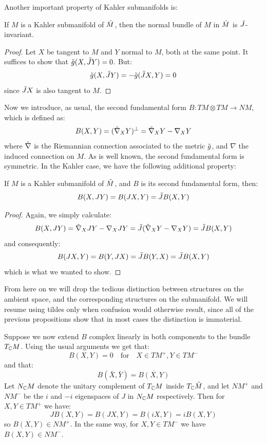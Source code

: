 Another important property of Kahler submanifolds is:

\begin{prop} If $M$ is a Kahler submanifold of $\tilde{M}$, then the normal bundle of $M$ in $\tilde{M}$ is $\tilde{J}$-invariant.
\end{prop}

\begin{proof} 
%
Let $X$ be tangent to $M$ and $Y$ normal to $M$, both at the same point.  It suffices to show that $\tilde{g} (X, \tilde{J} Y) = 0$.  But:
%
$$ \tilde{g} (X, \tilde{J} Y) = - \tilde{g} ( \tilde{J} X, Y) = 0 $$
%
since $ \tilde{J} X$ is also tangent to $M$.
%
\end{proof}

Now we introduce, as usual, the second fundamental form $B: TM \otimes TM \rightarrow NM$, which is defined as:
%
$$ B(X,Y) = (\tilde{\nabla}_X Y)^{\perp} = \tilde{\nabla}_X Y - \nabla_X Y $$
%
where $\tilde{\nabla}$ is the Riemannian connection associated to the metric $\tilde{g}$, and $\nabla$ the induced connection on $M$.  As is well known, the second fundamental form is symmetric.  In the Kahler case, we have the following additional property:
%
\begin{prop}
%
If $M$ is a Kahler submanifold of $\tilde{M}$, and $B$ is its second fundamental form, then:
%
$$ B(X,JY) = B(JX,Y) = \tilde{J} B(X,Y) $$
%
\end{prop}

\begin{proof}
%
Again, we simply calculate:
%
$$ B(X, JY) = \tilde{\nabla}_X J Y - \nabla_X JY = \tilde{J} ( \tilde{\nabla}_X Y - \nabla_X Y ) = \tilde{J} B(X,Y) $$
% 
and consequently:
%
$$ B( JX, Y ) = B( Y, JX ) = \tilde{J} B (Y,X) = \tilde{J} B(X,Y) $$
%
which is what we wanted to show.
%
\end{proof}

From here on we will drop the tedious distinction between structures on the ambient space, and the corresponding structures on the submanifold. We will resume using tildes only when confusion would otherwise result, since all of the previous propositions show that in most cases the distinction is immaterial.

\begin{remark}  Suppose we now extend $B$ complex linearly in both components to the bundle $T_{\mathbb{C}}M$.  Using the usual arguments we get that:
%
$$ B(X,Y) = 0 \quad \text{for} \quad X \in TM^{+}, Y \in TM^{-} $$
%
and that:
%
$$ B(\bar{X}, \bar{Y} ) = \overline{ B(X,Y) } $$
%
Let $N_{\mathbb{C}}M$ denote the unitary complement of $T_{\mathbb{C}}M$ inside $T_{\mathbb{C}} \tilde{M}$, and let $NM^{+}$ and $NM^{-}$ be the $i$ and $-i$ eigenspaces of $J$ in $N_{\mathbb{C}}M$ respectively.  Then for $X,Y \in TM^{+}$ we have:
%
$$ J B(X,Y) = B( JX, Y ) = B( iX, Y ) = i B(X,Y) $$
%
so $B(X,Y) \in NM^{+}$.  In the same way, for $X,Y \in TM^{-}$ we have $B(X,Y) \in NM^{-}$.
%
\end{remark}

